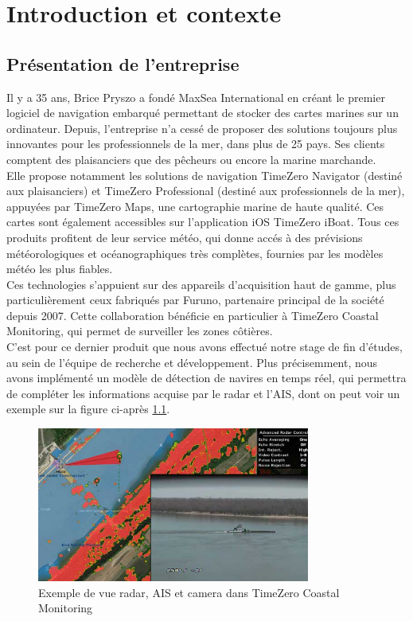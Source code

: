 \chapter{Introduction et contexte}


\section{Présentation de l'entreprise}

Il y a 35 ans, Brice Pryszo a fondé MaxSea International en créant le premier logiciel de navigation embarqué
permettant de stocker des cartes marines sur un ordinateur. Depuis, l'entreprise n'a cessé de proposer
des solutions toujours plus innovantes pour les professionnels de la mer, dans plus de 25 pays.
Ses clients comptent des plaisanciers que des pêcheurs ou encore la marine marchande. \\
Elle propose notamment les solutions de navigation TimeZero Navigator (destiné aux plaisanciers)
et TimeZero Professional (destiné aux professionnels de la mer), appuyées par TimeZero Maps,
une cartographie marine de haute qualité.
Ces cartes sont également accessibles sur l'application iOS TimeZero iBoat.
Tous ces produits profitent de leur service météo, qui donne accés à des prévisions
météorologiques et océanographiques très complètes, fournies par les modèles météo les plus fiables.\\

Ces technologies s'appuient sur des appareils d'acquisition haut de gamme, plus particulièrement
ceux fabriqués par Furuno, partenaire principal de la société depuis 2007. Cette collaboration
bénéficie en particulier à TimeZero Coastal Monitoring, qui permet de surveiller les zones côtières. \\

C'est pour ce dernier produit que nous avons effectué notre stage de fin d'études, au sein de l'équipe
de recherche et développement. Plus précisemment, nous avons implémenté un modèle
de détection de navires en temps réel, qui permettra de compléter les informations acquise par le radar
et l'AIS, dont on peut voir un exemple sur la figure ci-après \ref{fig:radar}.

\begin{figure}[H]
    \centering
    \includegraphics[width=0.8\textwidth]{./img/ports-harbors-cameras1.jpg}
    \caption{Exemple de vue radar, AIS et camera dans TimeZero Coastal Monitoring}
    \label{fig:radar}
\end{figure}

